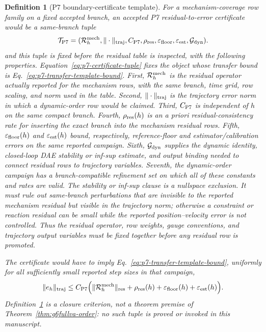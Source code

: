 \documentclass[preprint,12pt]{elsarticle}
\newtheorem{definition}{Definition}
\begin{document}
\begin{definition}[P7 boundary-certificate template]
\label{def:p7-transfer-certificate-template}
For a mechanism-coverage row family on a fixed accepted branch, an accepted
P7 residual-to-error certificate would be a same-branch tuple
\begin{equation}
\label{eq:p7-certificate-tuple}
  \mathcal T_{\rm P7}
  =(\mathcal R_h^{\rm mech},\|\cdot\|_{\rm traj},C_{\rm P7},
    \rho_{\rm res},\varepsilon_{\rm floor},\varepsilon_{\rm est},
    \mathcal G_{\rm dyn}).
\end{equation}
and this tuple is fixed before the residual table is inspected, with the following properties.
Equation~\eqref{eq:p7-certificate-tuple} fixes the object whose transfer
bound is Eq.~\eqref{eq:p7-transfer-template-bound}.
First, \(\mathcal R_h^{\rm mech}\) is the residual operator actually reported
for the mechanism rows, with the same branch, time grid, row scaling, and
norm used in the table. Second, \(\|\cdot\|_{\rm traj}\) is the trajectory
error norm in which a dynamic-order row would be claimed. Third,
\(C_{\rm P7}\) is independent of \(h\) on the same compact branch. Fourth,
\(\rho_{\rm res}(h)\) is an a priori residual-consistency rate for inserting
the exact branch into the mechanism residual rows. Fifth,
\(\varepsilon_{\rm floor}(h)\) and \(\varepsilon_{\rm est}(h)\) bound,
respectively, reference-floor and estimator/calibration errors on the same
reported campaign. Sixth, \(\mathcal G_{\rm dyn}\) supplies the dynamic
identity, closed-loop DAE stability or inf-sup estimate, and output binding
needed to connect residual rows to trajectory variables. Seventh, the
dynamic-order campaign has a branch-compatible refinement set on which all
of these constants and rates are valid.
The stability or inf-sup clause is a nullspace exclusion.  It must rule out
same-branch perturbations that are invisible to the reported mechanism
residual but visible in the trajectory norm; otherwise a constraint or
reaction residual can be small while the reported position--velocity error is
not controlled.  Thus the residual operator, row weights, gauge conventions,
and trajectory output variables must be fixed together before any residual row
is promoted.

The certificate would have to imply Eq.~\eqref{eq:p7-transfer-template-bound},
uniformly for all sufficiently small
reported step sizes in that campaign,
\begin{equation}
\label{eq:p7-transfer-template-bound}
  \|e_h\|_{\rm traj}
  \le C_{\rm P7}\Bigl(
     \|\mathcal R_h^{\rm mech}\|_{\rm res}
     +\rho_{\rm res}(h)
     +\varepsilon_{\rm floor}(h)
     +\varepsilon_{\rm est}(h)
  \Bigr).
\end{equation}
Definition~\ref{def:p7-transfer-certificate-template} is a closure criterion,
not a theorem premise of Theorem~\ref{thm:g6fullva-order}: no such tuple is
proved or invoked in this manuscript.
\end{definition}
\end{document}
